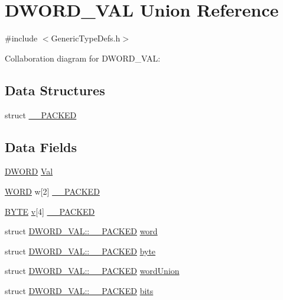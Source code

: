 \hypertarget{union_d_w_o_r_d___v_a_l}{}\section{D\+W\+O\+R\+D\+\_\+\+V\+A\+L Union Reference}
\label{union_d_w_o_r_d___v_a_l}


{\ttfamily \#include $<$Generic\+Type\+Defs.\+h$>$}



Collaboration diagram for D\+W\+O\+R\+D\+\_\+\+V\+A\+L\+:
\subsection*{Data Structures}
\begin{DoxyCompactItemize}
\item 
struct \hyperlink{struct_d_w_o_r_d___v_a_l_1_1_____p_a_c_k_e_d}{\+\_\+\+\_\+\+P\+A\+C\+K\+E\+D}
\end{DoxyCompactItemize}
\subsection*{Data Fields}
\begin{DoxyCompactItemize}
\item 
\hyperlink{_generic_type_defs_8h_ad342ac907eb044443153a22f964bf0af}{D\+W\+O\+R\+D} \hyperlink{union_d_w_o_r_d___v_a_l_a1a2aefd22f32fe19c7a40fd62958b591}{Val}
\item 
\hyperlink{_generic_type_defs_8h_a2b0e863dadf920709ec53d9088ee7c91}{W\+O\+R\+D} w\mbox{[}2\mbox{]} \hyperlink{union_d_w_o_r_d___v_a_l_afe4adbb94ca3dcff16d01c708e733676}{\+\_\+\+\_\+\+P\+A\+C\+K\+E\+D}
\item 
\hyperlink{_generic_type_defs_8h_a4ae1dab0fb4b072a66584546209e7d58}{B\+Y\+T\+E} \hyperlink{_s_p_i_flash_8c_a51a3fc6fe361f8f5a7a91799fecd2c9a}{v}\mbox{[}4\mbox{]} \hyperlink{union_d_w_o_r_d___v_a_l_a70952bfab8399a96313563a13e17ed80}{\+\_\+\+\_\+\+P\+A\+C\+K\+E\+D}
\item 
struct \hyperlink{struct_d_w_o_r_d___v_a_l_1_1_____p_a_c_k_e_d}{D\+W\+O\+R\+D\+\_\+\+V\+A\+L\+::\+\_\+\+\_\+\+P\+A\+C\+K\+E\+D} \hyperlink{union_d_w_o_r_d___v_a_l_afaba180484520f5e83d699aeb6a67551}{word}
\item 
struct \hyperlink{struct_d_w_o_r_d___v_a_l_1_1_____p_a_c_k_e_d}{D\+W\+O\+R\+D\+\_\+\+V\+A\+L\+::\+\_\+\+\_\+\+P\+A\+C\+K\+E\+D} \hyperlink{union_d_w_o_r_d___v_a_l_a4790ca552a89e97441bece3078aa8785}{byte}
\item 
struct \hyperlink{struct_d_w_o_r_d___v_a_l_1_1_____p_a_c_k_e_d}{D\+W\+O\+R\+D\+\_\+\+V\+A\+L\+::\+\_\+\+\_\+\+P\+A\+C\+K\+E\+D} \hyperlink{union_d_w_o_r_d___v_a_l_a61a9a0a4f8e98991e87e8b16aad916e5}{word\+Union}
\item 
struct \hyperlink{struct_d_w_o_r_d___v_a_l_1_1_____p_a_c_k_e_d}{D\+W\+O\+R\+D\+\_\+\+V\+A\+L\+::\+\_\+\+\_\+\+P\+A\+C\+K\+E\+D} \hyperlink{union_d_w_o_r_d___v_a_l_a8945fb9e4b638e5e5211393ef79d5581}{bits}
\end{DoxyCompactItemize}


